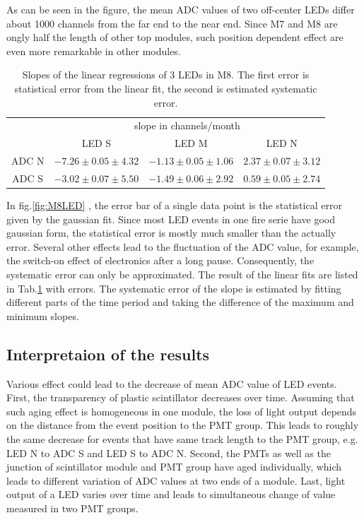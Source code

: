 As can be seen in the figure, the mean ADC values of two off-center LEDs differ about 1000 channels from the far end to the near end. Since M7 and M8 are ongly half the length of other top modules, such position dependent effect are even more remarkable in other modules.

\begin{table}[hb]
  \centering
  \caption{Slopes of the linear regressions of 3 LEDs in M8. The first error is statistical error from the linear fit, the second is estimated systematic error. }
  \label{tab:led}
  \begin{tabular}{c c c c}
  \toprule
        & \multicolumn{3}{c}{slope in channels/month} \\
        & LED S   & LED M  & LED N \\
  \midrule
  ADC N & $-7.26\pm0.05\pm4.32$ & $-1.13\pm0.05\pm1.06$ & $2.37\pm0.07\pm3.12$  \\
  ADC S & $-3.02\pm0.07\pm5.50$ & $-1.49\pm0.06\pm2.92$ & $0.59\pm0.05\pm2.74$  \\
  \bottomrule
  \end{tabular}

\end{table}

In fig.\ref{fig:M8LED} , the error bar of a single data point is the statistical error given by the gaussian fit. Since most LED events in one fire serie have good gaussian form, the statistical error is mostly much smaller than the actually error. Several other effects lead to the fluctuation of the ADC value, for example, the switch-on effect of electronics after a long pause. Consequently, the systematic error can only be approximated. The result of the linear fits are listed in Tab.\ref{tab:led} with errors. The systematic error of the slope is estimated by fitting different parts of the time period and taking the difference of the maximum and minimum slopes.

\subsection{Interpretaion of the results}


Various effect could lead to the decrease of mean ADC value of LED events. First, the transparency of plastic scintillator decreases over time. Assuming that such aging effect is homogeneous in one module, the loss of light output depends on the distance from the event position to the PMT group. This leads to roughly the same decrease for events that have same track length to the PMT group, e.g. LED N to ADC S and LED S to ADC N. Second, the PMTs as well as the junction of scintillator module and PMT group have aged individually, which leads to different variation of ADC values at two ends of a module. Last, light output of a LED varies over time and leads to simultaneous change of value measured in two PMT groups.

